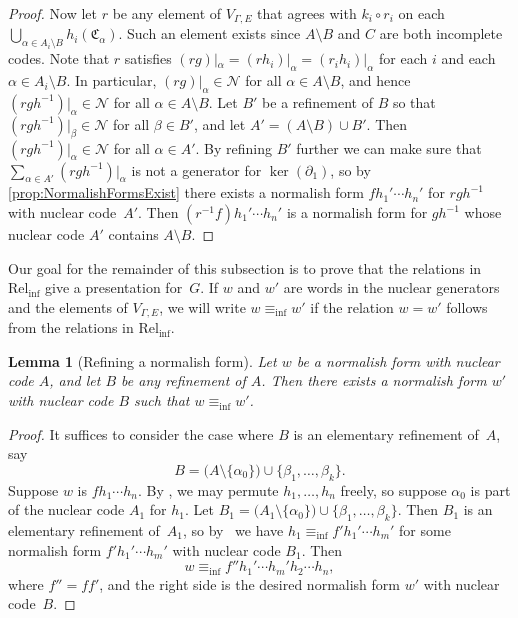 \documentclass[11pt,letterpaper]{amsart}
\newtheorem{lemma}[theorem]{Lemma}
\theoremstyle{definition}
\newcommand{\Nuc}{\mathcal{N}}
\newcommand{\C}{\mathfrak{C}}
\begin{document}
\begin{proof}
Now let $r$ be any element of $V_{\Gamma,E}$ that agrees with $k_i\circ r_i$ on each $\bigcup_{\alpha\in A_i\setminus B} h_i(\C_\alpha)$. Such an element exists since $A\setminus B$ and $C$ are both incomplete codes. Note that $r$ satisfies $(rg)|_\alpha = (r h_i)|_\alpha=(r_ih_i)|_\alpha$ for each $i$ and each $\alpha\in A_i\setminus B$.  In particular, $(rg)|_\alpha\in \Nuc$ for all $\alpha\in A\setminus B$, and hence $(rgh^{-1})|_{\alpha}\in \Nuc$ for all $\alpha\in A\setminus B$.  Let $B'$ be a refinement of $B$ so that $(rgh^{-1})|_{\beta}\in \Nuc$ for all $\beta\in B'$, and let $A'=(A\setminus B)\cup B'$.  Then $(rgh^{-1})|_\alpha\in \Nuc$ for all $\alpha\in A'$. By refining $B'$ further we can make sure that $\sum_{\alpha\in A'} (rgh^{-1})|_\alpha$ is not a generator for $\ker(\partial_1)$, so by \cref{prop:NormalishFormsExist} there exists a normalish form $fh_1'\cdots h_n'$ for $rgh^{-1}$ with nuclear code~$A'$.  Then $(r^{-1}f)h_1'\cdots h_n'$ is a normalish form for $gh^{-1}$ whose nuclear code $A'$ contains $A\setminus B$.
\end{proof}

\newcommand{\eqinf}{\equiv_{\mathrm{inf}}}%
Our goal for the remainder of this subsection is to prove that the relations in $\mathrm{Rel}_{\mathrm{inf}}$ give a presentation for~$G$.  If $w$ and $w'$ are words in the nuclear generators and the elements of $V_{\Gamma,E}$, we will write $w \eqinf w'$ if the relation $w=w'$ follows from the relations in $\mathrm{Rel}_{\mathrm{inf}}$.

\begin{lemma}[Refining a normalish form]\label{lem:RefineNormalish}
Let $w$ be a normalish form with nuclear code $A$, and let $B$ be any refinement of $A$.  Then there exists a normalish form $w'$ with nuclear code $B$ such that $w\eqinf w'$.
\end{lemma}

\begin{proof}
It suffices to consider the case where $B$ is an elementary refinement of~$A$, say
\[
B = \bigl(A\setminus\{\alpha_0\}\bigr)\cup \{\beta_1,\ldots,\beta_k\}.
\]
Suppose $w$ is $fh_1\cdots h_n$.  By \DisjComm, we may permute $h_1,\ldots,h_n$ freely, so suppose $\alpha_0$ is part of the nuclear code $A_1$ for $h_1$.  Let $B_1=\bigl(A_1\setminus\{\alpha_0\}\bigr)\cup \{\beta_1,\ldots,\beta_k\}$.  Then $B_1$ is an elementary refinement of~$A_1$, so by \Refine\ we have $h_1\eqinf f'h_1'\cdots h_m'$ for some normalish form $f'h_1'\cdots h_m'$ with nuclear code $B_1$.  Then
\[
w \eqinf f'' h_1'\cdots h_m'h_2\cdots h_n,
\]
where $f''=ff'$, and the right side is the desired normalish form $w'$ with nuclear code~$B$.
\end{proof}
\end{document}
